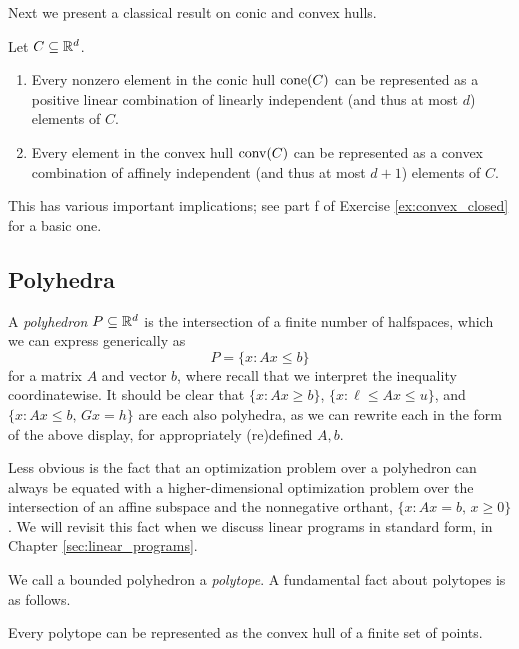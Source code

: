 Next we present a classical result on conic and convex hulls.

\begin{Theorem}
\label{thm:caratheodory}
Let $C \subseteq \mathbb{R}^d$.

\begin{enumerate}[label=(\roman*)]
\item Every nonzero element in the conic hull $\operatorname{cone}(C)$ can be represented as a
  positive linear combination of linearly independent (and thus at most $d$)
  elements of $C$.  

\item Every element in the convex hull $\operatorname{conv}(C)$ can be represented as a convex
  combination of affinely independent (and thus at most $d+1$) elements of $C$.  
\end{enumerate}
\end{Theorem}


This has various important implications; see part f of Exercise
\ref{ex:convex_closed} for a basic one. 

\subsection{Polyhedra}
\label{sec:polyhedra}

A \emph{polyhedron} $P \subseteq \mathbb{R}^d$ is the intersection of a finite number of
halfspaces, which we can express generically as 
\[
P = \{x : Ax \leq b\}
\] 
for a matrix $A$ and vector $b$, where recall that we interpret the inequality 
coordinatewise. It should be clear that $\{x : Ax \geq b\}$, $\{x : \ell \leq Ax
\leq u\}$, and $\{x : Ax \leq b, \, Gx = h\}$ are each also polyhedra, as we 
can rewrite each in the form of the above display, for appropriately (re)defined
$A,b$. 

Less obvious is the fact that an optimization problem over a polyhedron can
always be equated with a higher-dimensional optimization problem over the
intersection of an affine subspace and the nonnegative orthant, $\{x : Ax=b, \,
x \geq 0 \}$. We will revisit this fact when we discuss linear programs in
standard form, in Chapter \ref{sec:linear_programs}. 

We call a bounded polyhedron a \emph{polytope}. A fundamental fact about
polytopes is as follows. 

\begin{Theorem}
\label{thm:hv_representation}
Every polytope can be represented as the convex hull of a finite set of points. 
\end{Theorem}

